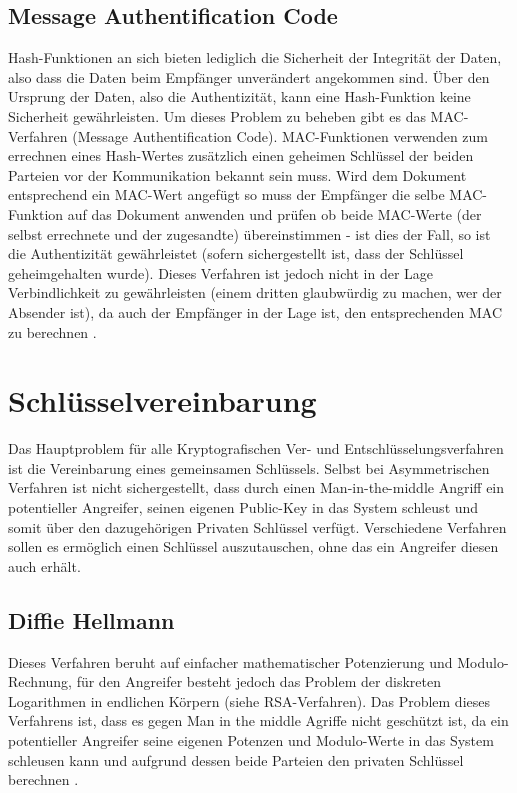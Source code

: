 \documentclass[10pt, a4paper,headsepline]{scrreprt}
\begin{document}
\subsection{Message Authentification Code}
Hash-Funktionen an sich bieten lediglich die Sicherheit der Integrität der Daten, also dass die Daten beim Empfänger unverändert angekommen sind. Über den Ursprung der Daten, also die Authentizität, kann eine Hash-Funktion keine Sicherheit gewährleisten. Um dieses Problem zu beheben gibt es das MAC-Verfahren (Message Authentification Code). MAC-Funktionen verwenden zum errechnen eines Hash-Wertes zusätzlich einen geheimen Schlüssel der beiden Parteien vor der Kommunikation bekannt sein muss. Wird dem Dokument entsprechend ein MAC-Wert angefügt so muss der Empfänger die selbe MAC-Funktion auf das Dokument anwenden und prüfen ob beide MAC-Werte (der selbst errechnete und der zugesandte) übereinstimmen - ist dies der Fall, so ist die Authentizität gewährleistet (sofern sichergestellt ist, dass der Schlüssel geheimgehalten wurde). Dieses Verfahren ist jedoch nicht in der Lage Verbindlichkeit zu gewährleisten (einem dritten glaubwürdig zu machen, wer der Absender ist), da auch der Empfänger in der Lage ist, den entsprechenden MAC zu berechnen \citep[S. 97ff] {book:practical-crypto}.


\section{Schlüsselvereinbarung} 
Das Hauptproblem für alle Kryptografischen Ver- und Entschlüsselungsverfahren ist die Vereinbarung eines gemeinsamen Schlüssels. Selbst bei Asymmetrischen Verfahren ist nicht sichergestellt, dass durch einen Man-in-the-middle Angriff ein potentieller Angreifer, seinen eigenen Public-Key in das System schleust und somit über den dazugehörigen Privaten Schlüssel verfügt. Verschiedene Verfahren sollen es ermöglich einen Schlüssel auszutauschen, ohne das ein Angreifer diesen auch erhält.

\subsection{Diffie Hellmann}
Dieses Verfahren beruht auf einfacher mathematischer Potenzierung und Modulo-Rechnung, für den Angreifer besteht jedoch das Problem der diskreten Logarithmen in endlichen Körpern (siehe RSA-Verfahren). Das Problem dieses Verfahrens ist, dass es gegen Man in the middle Agriffe nicht geschützt ist, da ein potentieller Angreifer seine eigenen Potenzen und Modulo-Werte in das System schleusen kann und aufgrund dessen beide Parteien den privaten Schlüssel berechnen \citep[S. 211]{book:practical-crypto} \citep[S. 587]{book:angewandte-krypto}.
\end{document}
